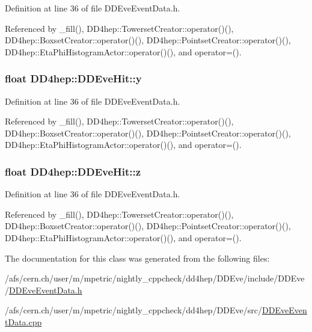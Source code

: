 Definition at line 36 of file DDEveEventData.h.

Referenced by \_\-fill(), DD4hep::TowersetCreator::operator()(), DD4hep::BoxsetCreator::operator()(), DD4hep::PointsetCreator::operator()(), DD4hep::EtaPhiHistogramActor::operator()(), and operator=().\hypertarget{class_d_d4hep_1_1_d_d_eve_hit_a4eb2c75de026adb1bc8d73267c8a3fb4}{
\subsubsection[{y}]{\setlength{\rightskip}{0pt plus 5cm}float {\bf DD4hep::DDEveHit::y}}}
\label{class_d_d4hep_1_1_d_d_eve_hit_a4eb2c75de026adb1bc8d73267c8a3fb4}


Definition at line 36 of file DDEveEventData.h.

Referenced by \_\-fill(), DD4hep::TowersetCreator::operator()(), DD4hep::BoxsetCreator::operator()(), DD4hep::PointsetCreator::operator()(), DD4hep::EtaPhiHistogramActor::operator()(), and operator=().\hypertarget{class_d_d4hep_1_1_d_d_eve_hit_affe739f66c56ced8a7d79b5c736f3b21}{
\subsubsection[{z}]{\setlength{\rightskip}{0pt plus 5cm}float {\bf DD4hep::DDEveHit::z}}}
\label{class_d_d4hep_1_1_d_d_eve_hit_affe739f66c56ced8a7d79b5c736f3b21}


Definition at line 36 of file DDEveEventData.h.

Referenced by \_\-fill(), DD4hep::TowersetCreator::operator()(), DD4hep::BoxsetCreator::operator()(), DD4hep::PointsetCreator::operator()(), DD4hep::EtaPhiHistogramActor::operator()(), and operator=().

The documentation for this class was generated from the following files:\begin{DoxyCompactItemize}
\item 
/afs/cern.ch/user/m/mpetric/nightly\_\-cppcheck/dd4hep/DDEve/include/DDEve/\hyperlink{_d_d_eve_event_data_8h}{DDEveEventData.h}\item 
/afs/cern.ch/user/m/mpetric/nightly\_\-cppcheck/dd4hep/DDEve/src/\hyperlink{_d_d_eve_event_data_8cpp}{DDEveEventData.cpp}\end{DoxyCompactItemize}
